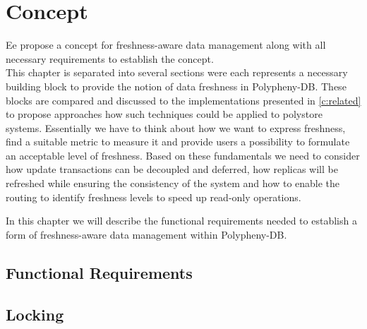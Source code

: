 \chapter{Concept}
\label{c:concept}

Ee propose a concept for freshness-aware data management along with all necessary requirements to establish the concept.\\

This chapter is separated into several sections were each represents a necessary building block to provide the notion of data freshness in Polypheny-DB.
These blocks are compared and discussed to the implementations presented in \ref{c:related} to propose approaches how such techniques could be applied to polystore
systems. Essentially we have to think about how we want to express freshness, find a suitable metric to measure it and provide users a possibility to formulate 
an acceptable level of freshness. Based on these fundamentals we need to consider how update transactions can be decoupled and deferred, how replicas will
be refreshed while ensuring the consistency of the system and how to enable the routing to identify freshness levels to speed up read-only operations. 

In this chapter we will describe the functional requirements needed to establish a form of freshness-aware data management within Polypheny-DB.

\section{Functional Requirements}



\section{Locking}






